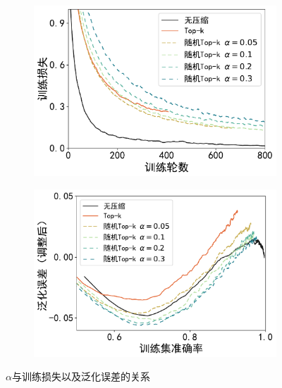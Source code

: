\begin{figure}[h!]
    \centering
    \begin{subfigure}{0.45\linewidth}
        \includegraphics[width=1\linewidth]{Z_Resources/randtopk_cifar100-trainacc.pdf}
        \label{fig:randomized_topk-cifar-trainloss}
    \end{subfigure}
    \begin{subfigure}{0.47\linewidth}
        \includegraphics[width=1\linewidth]{Z_Resources/randtopk_cifar100-generror.pdf}
        \label{fig:randomized_topk-cifar-generror}
    \end{subfigure}
    \caption{$\alpha$与训练损失以及泛化误差的关系}
    \label{fig:randomized_topk-alpha-loss}
\end{figure}


